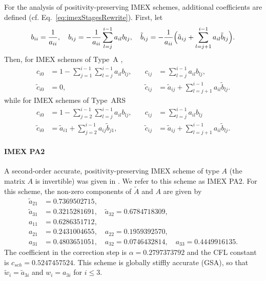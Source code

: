 For the analysis of positivity-preserving IMEX schemes, additional coefficients are defined \cite{hu_etal_2018} (cf. Eq.~\eqref{eq:imexStagesRewrite}).  
First, let
\begin{equation}
  b_{ii} = \frac{1}{a_{ii}}, \quad
  b_{ij} = -\frac{1}{a_{ii}}\sum_{l=j}^{i-1}a_{il}b_{lj}, \quad
  \tilde{b}_{ij} = -\frac{1}{a_{ii}}\Big(\tilde{a}_{ij}+\sum_{l=j+1}^{i-1}a_{il}\tilde{b}_{lj}\Big).  
\end{equation}
Then, for IMEX schemes of Type~A \cite{dimarcoPareschi2013},
\begin{equation}
  \begin{aligned}
    c_{i0} &= 1-\sum_{j=1}^{i-1}\sum_{l=j}^{i-1}a_{il}b_{lj}, \quad &
    c_{ij} &= \sum_{l=j}^{i-1}a_{il}b_{lj}, \\
    \tilde{c}_{i0} &= 0, \quad &
    \tilde{c}_{ij} &= \tilde{a}_{ij} + \sum_{l=j+1}^{i-1}a_{il}\tilde{b}_{lj}.
  \end{aligned}
\end{equation}
while for IMEX schemes of Type~ARS \cite{ascher_etal_1997}
\begin{equation}
\begin{aligned}
  c_{i0} &= 1-\sum_{j=2}^{i-1}\sum_{l=j}^{i-1}a_{il}b_{lj}, \quad &
  c_{ij} &= \sum_{l=j}^{i-1}a_{il}b_{lj} \\
  \tilde{c}_{i0} &= \tilde{a}_{i1}+\sum_{j=2}^{i-1}a_{ij}\tilde{b}_{j1}, \quad &
  \tilde{c}_{ij} &= \tilde{a}_{ij}+\sum_{l=j+1}^{i-1}a_{il}\tilde{b}_{lj}.  
\end{aligned}
\end{equation}

\paragraph{IMEX PA2}

A second-order accurate, positivity-preserving IMEX scheme of type $A$ (the matrix $A$ is invertible) was given in \cite{hu_etal_2018}.  
We refer to this scheme as IMEX PA2.  
For this scheme, the non-zero components of $\tilde{A}$ and $A$ are given by
\begin{align*}
  \tilde{a}_{21} &= 0.7369502715, \\
  \tilde{a}_{31} &= 0.3215281691, \quad \tilde{a}_{32} = 0.6784718309, \\
  a_{11} &= 0.6286351712, \\
  a_{21} &= 0.2431004655, \quad a_{22} = 0.1959392570, \\
  a_{31} &= 0.4803651051, \quad a_{32} = 0.0746432814, \quad a_{33} = 0.4449916135. 
\end{align*}
The coefficient in the correction step is $\alpha = 0.2797373792$ and the CFL constant is $c_{sch} = 0.5247457524$.
This scheme is globally stiffly accurate (GSA), so that $\tilde{w}_{i}=\tilde{a}_{3i}$ and $w_{i}=a_{3i}$ for $i\le3$.

